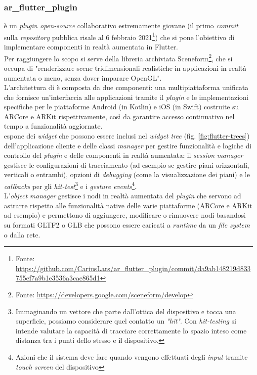 \subsubsection{ar\_flutter\_plugin}
\aplug{} è un \textit{plugin open-source} collaborativo estremamente giovane (il primo \textit{commit} sulla \textit{repository} pubblica risale al 6 febbraio 2021\footnote{Fonte: \url{https://github.com/CariusLars/ar_flutter_plugin/commit/da9ab148219d833755ef7a9b1e3536a3cae865d1}}) che si pone l'obiettivo di implementare componenti in realtà aumentata in Flutter.\\
Per raggiungere lo scopo si serve della libreria archiviata Sceneform\footnote{Fonte: \url{https://developers.google.com/sceneform/develop}}, che si occupa di "renderizzare scene tridimensionali realistiche in applicazioni in realtà aumentata o meno, senza dover imparare OpenGL".\\
L'architettura di \aplug{} è composta da due componenti: una \api{} multipiattaforma unificata che fornisce un'interfaccia alle applicazioni tramite il \textit{plugin} e le implementazioni specifiche per le piattaforme Android (in Kotlin) e iOS (in Swift) costruite su ARCore e ARKit rispettivamente, così da garantire accesso continuativo nel tempo a funzionalità aggiornate.\\
\aplug{} espone dei \textit{widget} che possono essere inclusi nel \textit{widget tree} (fig. \ref{fig:flutter-trees}) dell'applicazione cliente e delle classi \textit{manager} per gestire funzionalità e logiche di controllo del \textit{plugin} e delle componenti in realtà aumentata: il \textit{session manager} gestisce le configurazioni di tracciamento (ad esempio se gestire piani orizzontali, verticali o entrambi), opzioni di \textit{debugging} (come la visualizzazione dei piani) e le \textit{callbacks} per gli \textit{hit-test}\footnote{Immaginando un vettore che parte dall'ottica del dispositivo e tocca una superficie, possiamo considerare quel contatto un \textit{"hit"}. Con \textit{hit-testing} si intende valutare la capacità di tracciare correttamente lo spazio inteso come distanza tra i punti dello stesso e il dispositivo.} e i \textit{gesture events}\footnote{Azioni che il sistema deve fare quando vengono effettuati degli \textit{input} tramite \textit{touch screen} del dispositivo}.\\
L'\textit{object manager} gestisce i nodi in realtà aumentata del \textit{plugin} che servono ad astrarre rispetto alle funzionalità native delle varie piattaforme (ARCore e ARKit ad esempio) e permettono di aggiungere, modificare o rimuovere nodi basandosi su formati GLTF2 o GLB che possono essere caricati a \textit{runtime} da un \textit{file system} o dalla rete.\\
